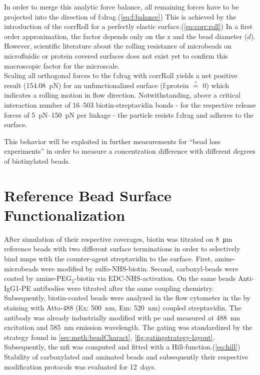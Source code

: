 In order to merge this analytic force balance, all remaining forces have to be projected into the direction of \acrfull{f:drag}.(\cref{eq:f:balance}) This is achieved by the introduction of the \gls{corrRoll} for a perfectly elastic surface.(\cref{eq:corr:roll}) In a first order approximation, the factor depends only on the \acrfull{z} and the bead diameter ($d$). However, scientific literature about the rolling resistance of microbeads on microfluidic or protein covered surfaces does not exist yet to confirm this macroscopic factor for the microscale. \\
Scaling all orthogonal forces to the \acrlong{f:drag} with \gls{corrRoll} yields a net positive result (\SI{154.08}{\pico\newton}) for an unfunctionalized surface (\gls{f:protein} $\overset{!}{=}$ \num{0}) which indicates a rolling motion in flow direction. Notwithstanding, above a critical interaction number of \numrange{16}{503} biotin-streptavidin bonds - for the respective release forces of \SIrange{5}{150}{\pico\newton} per linkage - the particle resists \acrlong{f:drag} and adheres to the surface.

This behavior will be exploited in further measurements for ``bead loss experiments'' in order to measure a concentration difference with different degrees of biotinylated beads.


\clearpage
\section{Reference Bead Surface Functionalization}
After simulation of their respective coverages, biotin was titrated on \SI{8}{\micro\meter} reference beads with two different surface terminations in order to selectively bind \glspl{mnp} with the counter-agent streptavidin to the surface. First, \gls{amine}-microbeads were modified by sulfo-NHS-biotin. Second, \gls{carboxyl}-beads were coated by amine-PEG$_2$-biotin via EDC-NHS-activation. On the same beads Anti-IgG1-PE antibodies were titrated after the same coupling chemistry.\\
Subsequently, biotin-coated beads were analyzed in the flow cytometer in the by staining with Atto-488 (Ex: \SI{500}{\nano\meter}, Em: \SI{520}{\nano\meter}) coupled streptavidin. The antibody was already industrially modified with \gls{pe} and measured at \SI{488}{\nano\meter} excitation and \SI{585}{\nano\meter}  emission wavelength. The gating was standardized by the strategy found in \cref{sec:meth:beadCharact}, \cref{fig:gatingstrategy-layout}. Subsequently, the \gls{mfi} was computed and fitted with a Hill-function.(\cref{eq:hill}) Stability of carboxylated and aminated beads and subsequently their respective modification protocols was evaluated for \SI{12}{days}.


